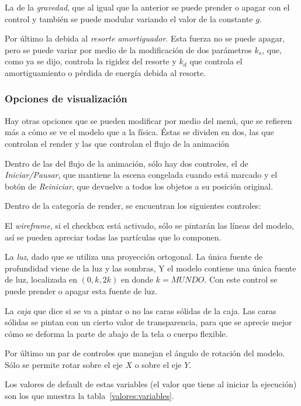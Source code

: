 La de la \emph{gravedad}, que al igual que la anterior se puede prender o apagar con el control y también se puede modular variando el valor de la constante $g$.

Por último la debida al \emph{resorte amortiguador}.
Esta fuerza no se puede apagar, pero se puede variar por medio de la modificación de dos parámetros $k_{s}$, que, como ya se dijo, controla la rigidez del resorte y $k_{d}$ que controla el amortiguamiento o pérdida de energía debida al resorte.

\subsubsection{Opciones de visualización}
Hay otras opciones que se pueden modificar por medio del menú, que se refieren más a cómo se ve el modelo que a la física.
Éstas se dividen en dos, las que controlan el render y las que controlan el flujo de la animación

Dentro de las del flujo de la animación, sólo hay dos controles, el de \emph{Iniciar/Pausar}, que mantiene la escena congelada cuando está marcado y el botón de \emph{Reiniciar}, que devuelve a todos los objetos a su posición original.

Dentro de la categoría de render, se encuentran los siguientes controles:

El \emph{wireframe}, si el checkbox está activado, sólo se pintarán las líneas del modelo, así se pueden apreciar todas las partículas que lo componen.

La \emph{luz}, dado que se utiliza una proyección ortogonal.
La única fuente de profundidad viene de la luz y las sombras, Y el modelo contiene una única fuente de luz, localizada en $(0, k, 2k)$ en donde $k = MUNDO$.
Con este control se puede prender o apagar esta fuente de luz.

La \emph{caja} que dice si se va a pintar o no las caras sólidas de la caja.
Las caras sólidas se pintan con un cierto valor de transparencia, para que se aprecie mejor cómo se deforma la parte de abajo de la tela o cuerpo flexible.

Por último un par de controles que manejan el ángulo de rotación del modelo.
Sólo se permite rotar sobre el eje $X$ o sobre el eje $Y$.

Los valores de default de estas variables (el valor que tiene al iniciar la ejecución) son los que muestra la tabla~\ref{valores:variables}.

